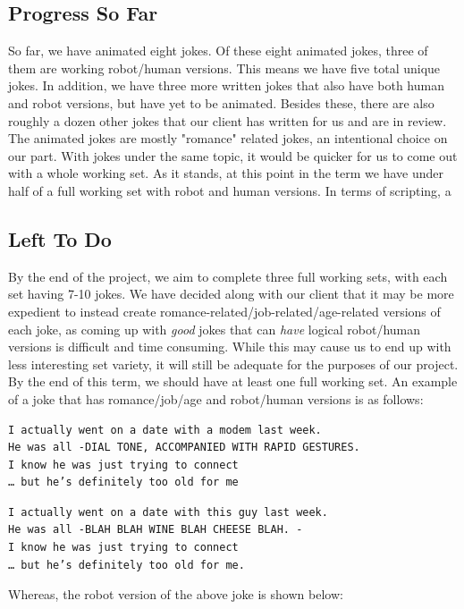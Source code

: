 \documentclass[onecolumn, draftclsnofoot,10pt, compsoc]{IEEEtran}
\begin{document}
\subsection{Progress So Far}
So far, we have animated eight jokes. Of these eight animated jokes, three of them are working robot/human versions. This means we have five total unique jokes. In addition, we have three more written jokes that also have both human and robot versions, but have yet to be animated. Besides these, there are also roughly a dozen other jokes that our client has written for us and are in review. The animated jokes are mostly "romance" related jokes, an intentional choice on our part. With jokes under the same topic, it would be quicker for us to come out with a whole working set. As it stands, at this point in the term we have under half of a full working set with robot and human versions. In terms of scripting, a
\subsection{Left To Do}
By the end of the project, we aim to complete three full working sets, with each set having 7-10 jokes. We have decided along with our client that it may be more expedient to instead create romance-related/job-related/age-related versions of each joke, as coming up with \textit{good} jokes that can \textit{have} logical robot/human versions is difficult and time consuming. While this may cause us to end up with less interesting set variety, it will still be adequate for the purposes of our project. By the end of this term, we should have at least one full working set. An example of a joke that has romance/job/age and robot/human versions is as follows:


\begin{lstlisting}
I actually went on a date with a modem last week.
He was all -DIAL TONE, ACCOMPANIED WITH RAPID GESTURES.
I know he was just trying to connect
… but he’s definitely too old for me
\end{lstlisting}

\begin{lstlisting}
I actually went on a date with this guy last week.
He was all -BLAH BLAH WINE BLAH CHEESE BLAH. -
I know he was just trying to connect
… but he’s definitely too old for me.
\end{lstlisting}



Whereas, the robot version of the above joke is shown below:
\end{document}
